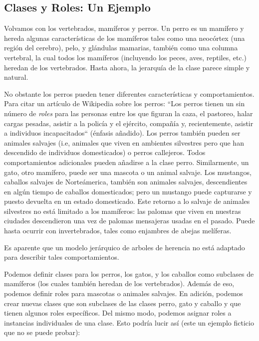 \subsection{Clases y Roles: Un Ejemplo}

  
Volvamos con los vertebrados, mamíferos y perros. Un perro
es un mamífero y hereda algunas características de los 
mamíferos tales como una neocórtex (una región del cerebro),
pelo, y glándulas mamarias, también como una columna vertebral,
la cual todos los mamíferos (incluyendo los peces, aves, reptiles, etc.)
heredan de los vertebrados. Hasta ahora, la jerarquía de la clase
parece simple y natural.

No obstante los perros pueden tener diferentes características y
comportamientos. Para citar un artículo de Wikipedia sobre los perros:
``Los perros tienen un sin número de \emph{roles} para las personas
entre los que figuran la caza, el pastoreo, halar cargas pesadas, asistir
a la policía y el ejército, compañía y, recientemente, asistir a
individuos incapacitados`` (énfasis añadido). Los perros también pueden 
ser animales salvajes (i.e, animales que viven en ambientes silvestres
pero que han descendido de individuos domesticados) o perros callejeros.
Todos comportamientos adicionales pueden añadirse a la clase perro.
Similarmente, un gato, otro mamífero, puede ser una mascota o
un animal salvaje. Los mustangos, caballos salvajes de Norteámerica,
también son animales salvajes, descendientes en algún tiempo de caballos
domesticados; pero un mustango puede capturarse y puesto devuelta
en un estado domesticado. Este retorno a lo salvaje de animales
silvestres no está limitado a los mamíferos: las palomas que viven
en nuestras ciudades descendieron una vez de palomas mensajeras
usadas en el pasado. Puede hasta ocurrir con invertebrados, tales
como enjambres de abejas melíferas.

Es aparente que un modelo jerárquico de arboles de herencia
no está adaptado para describir tales comportamientos.

  
Podemos definir clases para los perros, los gatos, y los 
caballos como subclases de mamíferos (los cuales también heredan
de los vertebrados). Además de eso, podemos definir roles para mascotas
o animales salvajes. En adición, podemos crear nuevas clases
que son subclases de las clases perro, gato y caballo y que 
tienen algunos roles específicos. Del mismo modo, podemos
asignar roles a instancias individuales de una clase. Esto
podría lucir así (este un ejemplo ficticio que no se puede probar):

